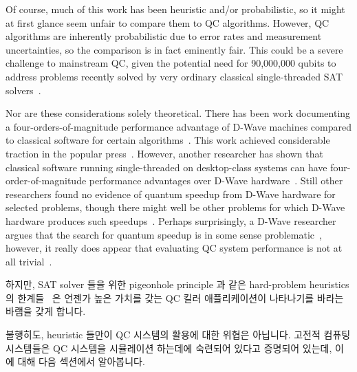 Of course, much of this work has been heuristic and/or probabilistic,
so it might at first glance seem unfair to compare them to
QC algorithms.
However, QC algorithms are inherently probabilistic due to error rates
and measurement uncertainties, so the comparison is in fact eminently
fair.
This could be a severe challenge to mainstream QC, given the potential
need for 90,000,000 qubits to address problems recently solved by
very ordinary classical single-threaded SAT
solvers~\cite{LihaoLiang2016VerifyTreeRCU}.

Nor are these considerations solely theoretical.
There has been work documenting a four-orders-of-magnitude
performance advantage of D-Wave machines compared to classical
software for certain algorithms~\cite{McGeoch:2013:EEA:2482767.2482797}.
This work achieved considerable traction in the popular
press~\cite{CharlesChoi2013D-WaveGoogleNASA}.
However, another researcher has shown that classical software running
single-threaded on desktop-class systems can
have four-order-of-magnitude performance advantages over
D-Wave hardware~\cite{AlexSelby2014D-Wave-vs-classical,AlexSelby2013D-WaveHarderQUBO}.
Still other researchers found no evidence of quantum speedup
from D-Wave hardware for selected problems, though there might well be
other problems for which D-Wave hardware produces such
speedups~\cite{AdrianCho2014QC-D-WaveNoSpeedup,TroelsFRonnow2014QC-D-WaveNoSpeedup}.
Perhaps surprisingly, a D-Wave researcher argues that the search for
quantum speedup is in some sense
problematic~\cite{MohammadHAmin2015QC-D-Wave-QuantumSpeedupProblematic},
however, it really does appear that evaluating QC system performance is
not at all
trivial~\cite{PhysRevLett.118.100601,ArsTechnica2017QC-SpeedTradeoffs}.
\fi

하지만, SAT solver 들을 위한 pigeonhole principle 과 같은 hard-problem
heuristics 의 한계들~\cite[page~38]{Kroening:2008:DPA:1391237} 은 언젠가 높은
가치를 갖는 QC 킬러 애플리케이션이 나타나기를 바라는 바램을 갖게 합니다.

불행히도, heuristic 들만이 QC 시스템의 활용에 대한 위협은 아닙니다.
고전적 컴퓨팅 시스템들은 QC 시스템을 시뮬레이션 하는데에 숙련되어 있다고
증명되어 있는데, 이에 대해 다음 섹션에서 알아봅니다.


